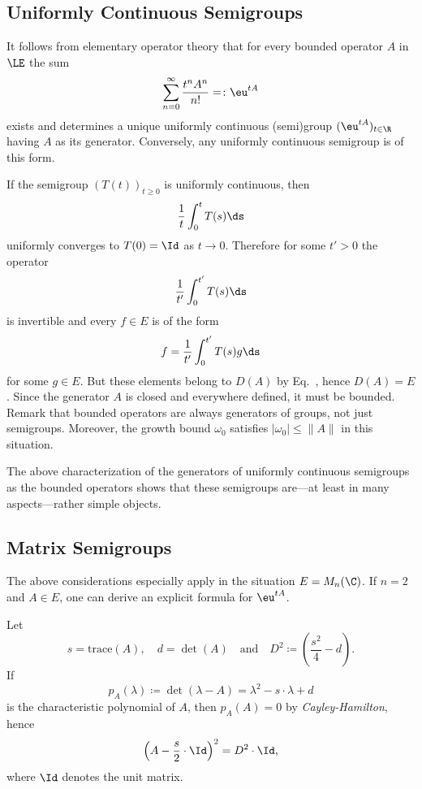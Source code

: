\subsection{Uniformly Continuous Semigroups}\label{subsec:a1-2.1}%
It follows from elementary operator theory that for every bounded operator $A$ in  $\LE$ the sum
\[
    \sum_{n=0}^{\infty} \frac{t^{n}A^{n}}{n!} = \colon  \eu^{tA}
\]
exists and determines a unique uniformly continuous (semi)group $( \eu^{tA})_{t \in \R}$ having $A$ as its generator.
Conversely, any uniformly continuous semigroup is of this form.

If the semigroup $(T(t))_{t \geq 0}$ is uniformly continuous, then 
%
\[
	\frac{1}{t}\int_{0}^{t} T(s) \ds
\]
%
uniformly converges to $T(0) = \Id$ as $t \to 0$.
Therefore for some $t' > 0$ the operator 
%
\[
	\frac{1}{t'}\int_{0}^{t'} T(s) \ds
\]
%
is invertible and every $f \in E$ is of the form 
%
\[
	f = \frac{1}{t'}\int_{0}^{t'} T(s)g \ds
\]
%
for some $g \in E$.
But these elements belong to $D(A)$ by Eq.~, hence $D(A) = E$.
Since the generator $A$ is closed and everywhere defined, it must be bounded.
Remark that bounded operators are always generators of groups, not just semigroups.
Moreover, the growth bound $\omega_0$ satisfies $|\omega_0| \leq \|A\|$ in this situation.

The above characterization of the generators of uniformly continuous semigroups as the bounded operators shows that these semigroups are---at least in many aspects---rather simple objects.
\subsection{Matrix Semigroups}\label{subsec:a1-2.2}%
The above considerations especially apply in the situation $E = M_{n}(\C)$.
If\/ $n = 2$ and $A \in E$, one can derive an explicit formula for $ \eu^{tA}$. 

Let %
\[
	s = \text{trace}(A), 
	\quad 
	d = \det(A) 
	\quad \text{and} \quad
	D^{2} \coloneqq \left( \frac{s^{2}}{4} - d \right).
\]
%
If   
\[
p_A(\lambda) \coloneqq \det(\lambda - A) = \lambda^2-s\cdot \lambda + d 
\]
is the characteristic polynomial  of\/ $ A $, then $ p_{A}(A) = 0 $ by \emph{Cayley-Hamilton}, hence
%
\[
	\left( A - \frac{s}{2} \cdot \Id \right)^{2} = D^{2} \cdot \Id , 
\]
%
where $ \Id $ denotes the unit matrix.

